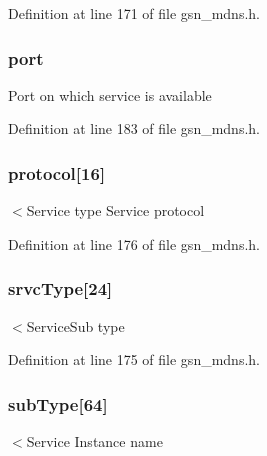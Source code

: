 Definition at line 171 of file gsn\_\-mdns.h.

\hypertarget{a00146_a126a61701dc53e71d74b8e1b50c01ce3}{
\subsubsection[{port}]{ {\bf port}}}
\label{a00146_a126a61701dc53e71d74b8e1b50c01ce3}
Port on which service is available 

Definition at line 183 of file gsn\_\-mdns.h.

\hypertarget{a00146_af6597a37273ce39652a0624ee5d2cd72}{
\subsubsection[{protocol}]{ {\bf protocol}\mbox{[}16\mbox{]}}}
\label{a00146_af6597a37273ce39652a0624ee5d2cd72}
$<$Service type Service protocol 

Definition at line 176 of file gsn\_\-mdns.h.

\hypertarget{a00146_a7865388e48a7e1f116b62c4eebfc369a}{
\subsubsection[{srvcType}]{ {\bf srvcType}\mbox{[}24\mbox{]}}}
\label{a00146_a7865388e48a7e1f116b62c4eebfc369a}
$<$ServiceSub type 

Definition at line 175 of file gsn\_\-mdns.h.

\hypertarget{a00146_a80101829ddb694c333de0c4bbcc202d2}{
\subsubsection[{subType}]{ {\bf subType}\mbox{[}64\mbox{]}}}
\label{a00146_a80101829ddb694c333de0c4bbcc202d2}
$<$Service Instance name 

